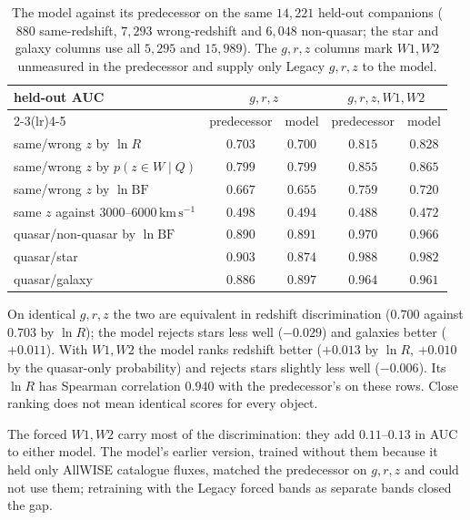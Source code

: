 \documentclass[11pt,a4paper]{article}
\newcommand{\kms}{\,\mathrm{km\,s^{-1}}}
\begin{document}
\begin{table}[htbp]
\centering
\small
\begin{tabular}{@{}lcccc@{}}
\toprule
held-out AUC & \multicolumn{2}{c}{$g,r,z$} & \multicolumn{2}{c}{$g,r,z,W1,W2$} \\
\cmidrule(lr){2-3}\cmidrule(lr){4-5}
 & predecessor & model & predecessor & model \\
\midrule
same/wrong $z$ by $\ln R$                 & $0.703$ & $0.700$ & $0.815$ & $\mathbf{0.828}$ \\
same/wrong $z$ by $p(z\in W\mid Q)$       & $0.799$ & $0.799$ & $0.855$ & $\mathbf{0.865}$ \\
same/wrong $z$ by $\ln\mathrm{BF}$        & $0.667$ & $0.655$ & $0.759$ & $0.720$ \\
same $z$ against $3000$--$6000\kms$       & $0.498$ & $0.494$ & $0.488$ & $0.472$ \\
quasar/non-quasar by $\ln\mathrm{BF}$      & $0.890$ & $0.891$ & $0.970$ & $0.966$ \\
quasar/star                                & $0.903$ & $0.874$ & $0.988$ & $0.982$ \\
quasar/galaxy                              & $0.886$ & $0.897$ & $0.964$ & $0.961$ \\
\bottomrule
\end{tabular}
\caption{The model against its predecessor on the same $14{,}221$ held-out
companions ($880$ same-redshift, $7{,}293$ wrong-redshift and $6{,}048$
non-quasar; the star and galaxy columns use all $5{,}295$ and $15{,}989$). The
$g,r,z$ columns mark $W1,W2$ unmeasured in the predecessor and supply only
Legacy $g,r,z$ to the model.}
\label{tab:predecessor}
\end{table}

On identical $g,r,z$ the two are equivalent in redshift discrimination
($0.700$ against $0.703$ by $\ln R$); the model rejects stars less well ($-0.029$)
and galaxies better ($+0.011$). With $W1,W2$ the model ranks redshift
better ($+0.013$ by $\ln R$, $+0.010$ by the quasar-only probability) and rejects
stars slightly less well ($-0.006$). Its $\ln R$ has Spearman correlation $0.940$
with the predecessor's on these rows. Close ranking does not mean identical
scores for every object.

The forced $W1,W2$ carry most of the discrimination: they add $0.11$--$0.13$ in
AUC to either model. The model's earlier version, trained without them because
it held only AllWISE catalogue fluxes, matched the predecessor on $g,r,z$ and
could not use them; retraining with the Legacy forced bands as separate bands
closed the gap.
\end{document}
